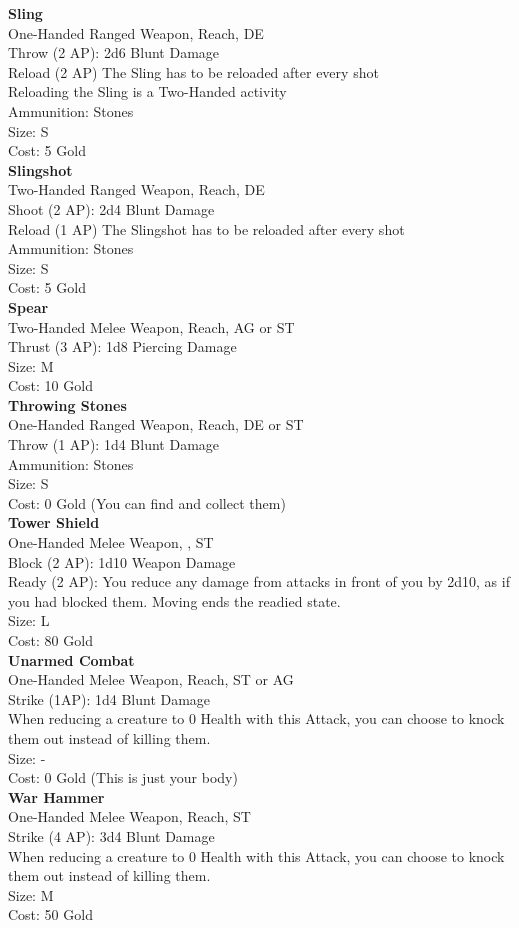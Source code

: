 \textbf{Sling}\\
One-Handed Ranged Weapon,  Reach, DE\\
Throw (2 AP): 2d6 Blunt Damage\\
Reload (2 AP) The Sling has to be reloaded after every shot\\
Reloading the Sling is a Two-Handed activity\\
Ammunition: Stones\\
Size: S\\
Cost: 5 Gold\\


\textbf{Slingshot}\\
Two-Handed Ranged Weapon,  Reach, DE\\
Shoot (2 AP): 2d4 Blunt Damage\\
Reload (1 AP) The Slingshot has to be reloaded after every shot\\
Ammunition: Stones\\
Size: S\\
Cost: 5 Gold\\


\textbf{Spear}\\
Two-Handed Melee Weapon,  Reach, AG or ST\\
Thrust (3 AP): 1d8 Piercing Damage\\
Size: M\\
Cost: 10 Gold\\


\textbf{Throwing Stones}\\
One-Handed Ranged Weapon,  Reach, DE or ST\\
Throw (1 AP): 1d4 Blunt Damage\\
Ammunition: Stones\\
Size: S\\
Cost: 0 Gold (You can find and collect them)\\


\textbf{Tower Shield}\\
One-Handed Melee Weapon, , ST\\
Block (2 AP): 1d10 Weapon Damage\\
Ready (2 AP): You reduce any damage from attacks in front of you by 2d10, as if you had blocked them. Moving ends the readied state.\\
Size: L\\
Cost: 80 Gold\\


\textbf{Unarmed Combat}\\
One-Handed Melee Weapon,  Reach, ST or AG\\
Strike (1AP): 1d4 Blunt Damage\\
When reducing a creature to 0 Health with this Attack, you can choose to knock them out instead of killing them.\\
Size: -\\
Cost: 0 Gold (This is just your body)\\


\textbf{War Hammer}\\
One-Handed Melee Weapon,  Reach, ST\\
Strike (4 AP): 3d4 Blunt Damage\\
When reducing a creature to 0 Health with this Attack, you can choose to knock them out instead of killing them.\\
Size: M\\
Cost: 50 Gold\\